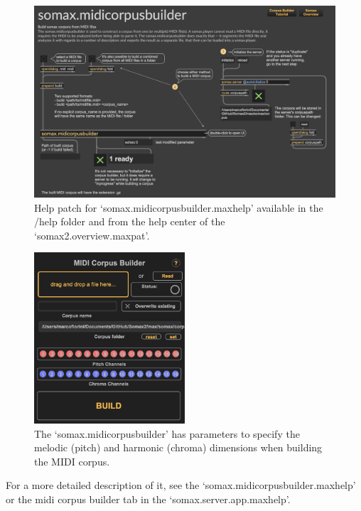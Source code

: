 \begin{figure}[H]
    \centering        
 	\includegraphics[width=1\textwidth, keepaspectratio]{img/midicorpusbuilder_help.png}
    \caption{Help patch for `somax.midicorpusbuilder.maxhelp' available in the /help folder and from the help center of the `somax2.overview.maxpat'.}
    \label{fig:midicorpusbuilder_help}
\end{figure}

 \begin{figure}[H]
    \centering        
 	\includegraphics[width=0.5\textwidth, keepaspectratio]{img/midicorpusbuilder.png}
    \caption{The `somax.midicorpusbuilder' has parameters to specify the melodic (pitch) and harmonic (chroma) dimensions when building the MIDI corpus.}
    \label{fig:midicorpusbuilder}
\end{figure}

For a more detailed description of it, see the `somax.midicorpusbuilder.maxhelp' or the midi corpus builder tab in the `somax.server.app.maxhelp'.

